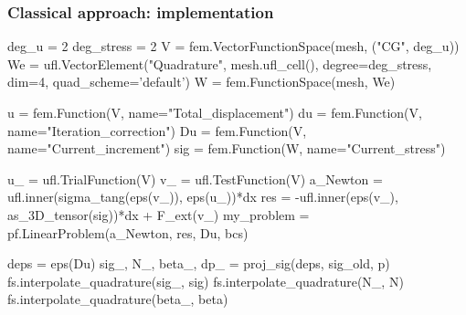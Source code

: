 \documentclass[9pt]{beamer}
\begin{document}
\begin{frame}[fragile]
  \frametitle{Classical approach: implementation}
  \begin{pythoncode}
    deg_u = 2
    deg_stress = 2
    V = fem.VectorFunctionSpace(mesh, ("CG", deg_u))
    We = ufl.VectorElement("Quadrature", mesh.ufl_cell(), degree=deg_stress, dim=4, quad_scheme='default')
    W = fem.FunctionSpace(mesh, We)

    u = fem.Function(V, name="Total_displacement")
    du = fem.Function(V, name="Iteration_correction")
    Du = fem.Function(V, name="Current_increment")
    sig = fem.Function(W, name="Current_stress")
  \end{pythoncode}

  \begin{pythoncode}
    u_ = ufl.TrialFunction(V)
    v_ = ufl.TestFunction(V)
    a_Newton = ufl.inner(sigma_tang(eps(v_)), eps(u_))*dx
    res = -ufl.inner(eps(v_), as_3D_tensor(sig))*dx + F_ext(v_)
    my_problem = pf.LinearProblem(a_Newton, res, Du, bcs)
  \end{pythoncode}

  \begin{pythoncode}
    deps = eps(Du)
    sig_, N_, beta_, dp_ = proj_sig(deps, sig_old, p)
    fs.interpolate_quadrature(sig_, sig)
    fs.interpolate_quadrature(N_, N)
    fs.interpolate_quadrature(beta_, beta)
  \end{pythoncode}

\end{frame}
\end{document}
